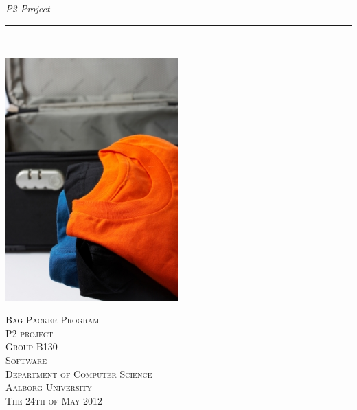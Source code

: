 \thispagestyle{empty}
\begin{flushright}
\vspace{3cm}

\phantom{hul}

\phantom{hul}

\phantom{hul}

\textsl{P2 Project} \\ \vspace{1cm}

\rule{13cm}{3mm} \\ \vspace{1.5cm}
\vspace{1cm}

\includegraphics[width=0.5\textwidth]{billeder/forside.jpg}

\vspace{2cm} 
\textsc{\Large Bag Packer Program \\
P2 project\\
Group B130\\
Software\\
Department of Computer Science\\
Aalborg University\\
The 24th of May 2012\\
}
\end{flushright}

